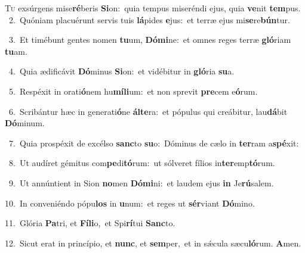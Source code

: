 \lettrine{\initial\textcolor{\initialcolor}{T}}{u} exsúrgens mise\-\textbf{ré}\-beris \textbf{Si}\-on:~\star quia tempus miseréndi ejus, quia \textbf{ve}\-nit \textbf{tem}\-pus.\\
{\numbfont\textcolor{\numbcolor}{~2.}}~Quóniam placuérunt servis tuis \textbf{lá}\-pides \textbf{e}\-jus:~\star et terræ ejus mi\-\textbf{se}\-re\-\textbf{bún}\-tur.\par
{\numbfont\textcolor{\numbcolor}{~3.}}~Et timébunt gentes nomen \textbf{tu}\-um, \textbf{Dó}\-\textbf{mi}ne:~\star et omnes reges terræ \textbf{gló}\-riam \textbf{tu}\-am.\par
{\numbfont\textcolor{\numbcolor}{~4.}}~Quia ædificávit \textbf{Dó}\-minus \textbf{Si}\-on:~\star et vidébitur in \textbf{gló}\-ria \textbf{su}\-a.\par
{\numbfont\textcolor{\numbcolor}{~5.}}~Respéxit in orati\-\textbf{ó}\-nem hu\-\textbf{mí}\-\textbf{li}um:~\star et non sprevit \textbf{pre}\-cem e\-\textbf{ó}\-rum.\par
{\numbfont\textcolor{\numbcolor}{~6.}}~Scribántur hæc in generati\-\textbf{ó}\-ne \textbf{ál}\-\textbf{te}ra:~\star et pópulus qui creábitur, lau\-\textbf{dá}\-bit \textbf{Dó}\-minum.\par
{\numbfont\textcolor{\numbcolor}{~7.}}~Quia prospéxit de excélso \textbf{sanc}\-to \textbf{su}\-o:~\star Dóminus de cælo in \textbf{ter}\-ram a\-\textbf{spé}\-xit:\par
{\numbfont\textcolor{\numbcolor}{~8.}}~Ut audíret gémitus com\-\textbf{pe}\-di\-\textbf{tó}\-rum:~\star ut sólveret fílios in\-\textbf{ter}\-emp\-\textbf{tó}\-rum.\par
{\numbfont\textcolor{\numbcolor}{~9.}}~Ut annúntient in Sion \textbf{no}\-men \textbf{Dó}\-\textbf{mi}ni:~\star et laudem ejus \textbf{in} Je\-\textbf{rú}\-salem.\par
{\numbfont\textcolor{\numbcolor}{10.}}~In conveniéndo pópu\textbf{los} in \textbf{u}\-num:~\star et reges ut \textbf{sér}\-viant \textbf{Dó}\-mino.\par
{\numbfont\textcolor{\numbcolor}{11.}}~Glória \textbf{Pa}\-tri, et \textbf{Fí}\-\textbf{li}o,~\star et Spi\-\textbf{rí}\-tui \textbf{Sanc}\-to.\par
{\numbfont\textcolor{\numbcolor}{12.}}~Sicut erat in princípio, et \textbf{nunc}\-, et \textbf{sem}\-per,~\star et in sǽcula sæcu\-\textbf{ló}\-rum. \textbf{A}\-men.\par
